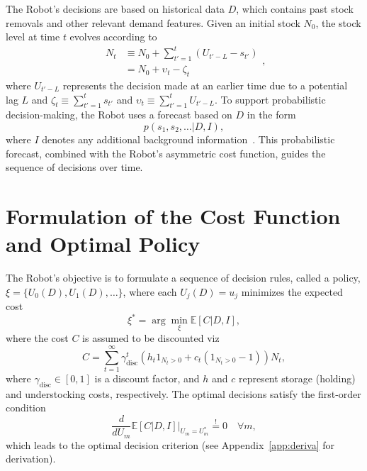 \documentclass[a4paper,12pt]{article}
\begin{document}
	The Robot’s decisions are based on historical data $D$, which contains past stock removals and other relevant demand features. Given an initial stock $N_0$, the stock level at time $t$ evolves according to
	\begin{equation}
		\begin{split}
			N_t &\equiv N_0 + \sum_{t'=1}^{t} (U_{t'-L} - s_{t'})\\
			& = N_0+\upsilon_t-\zeta_t
		\end{split},
	\end{equation}
	where $U_{t'-L}$ represents the decision made at an earlier time due to a potential lag $L$ and $\zeta_t\equiv \sum_{t'=1}^ts_{t'}$ and $\upsilon_t\equiv \sum_{t'=1}^tU_{t'-L}$. To support probabilistic decision-making, the Robot uses a forecast based on $D$ in the form
	\begin{equation}
		p(s_1, s_2, \dots | D, I),
	\end{equation}
	where $I$ denotes any additional background information~\citep{Sivia2006}. This probabilistic forecast, combined with the Robot's asymmetric cost function, guides the sequence of decisions over time.
	
	\section{Formulation of the Cost Function and Optimal Policy}
	The Robot’s objective is to formulate a sequence of decision rules, called a policy, $\xi = \{U_0(D), U_1(D), \dots\}$, where each $U_j(D) = u_j$ minimizes the expected cost
	\begin{equation}
		\xi^* = \arg \min_{\xi} \mathbb{E}[C | D, I],
	\end{equation}
	where the cost $C$ is assumed to be discounted viz
	\begin{equation}
		C = \sum_{t=1}^{\infty} \gamma_{\text{disc}}^{t} \left( h_t 1_{N_t> 0} + c_t (1_{N_t> 0}-1) \right)N_t,
		\label{eq:cost}
	\end{equation}
	where $\gamma_{\text{disc}} \in [0,1]$ is a discount factor, and $h$ and $c$ represent storage (holding) and understocking costs, respectively. The optimal decisions satisfy the first-order condition
	\begin{equation}
		\frac{d}{dU_m} \mathbb{E}[C | D, I] \Big|_{U_m = U_m^*} \overset{!}{=} 0 \quad \forall m,
		\label{eq:min_exp_cost}
	\end{equation}
	which leads to the optimal decision criterion (see Appendix~\ref{app:deriva} for derivation).
	
\end{document}

